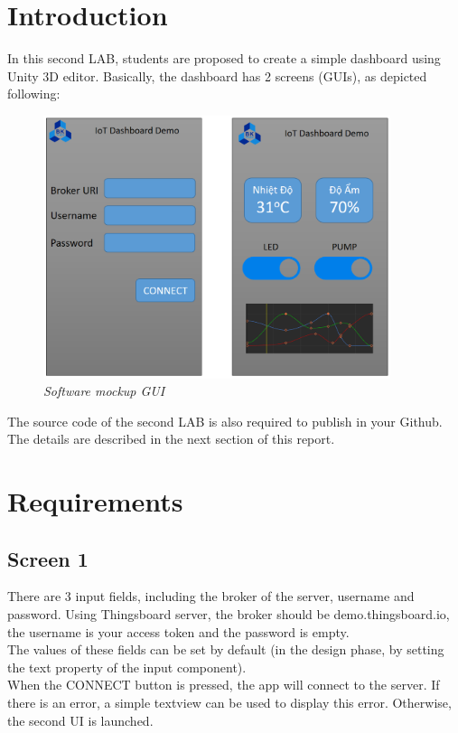 \documentclass[a4paper,11pt]{article}
\theoremstyle{mytheor}
\begin{document}
\renewcommand{\contentsname}{Content}
\newpage
\vspace{1cm}
\tableofcontents
\newpage

\section{Introduction}
In this second LAB, students are proposed to create a simple dashboard using Unity 3D editor. Basically, the dashboard has 2 screens (GUIs), as depicted following:
\begin{figure}[!htp]
    \centering
    \includegraphics[width=4in]{Lab2_Demo.png}
    \caption{\textit{Software mockup GUI}}
    \label{}
\end{figure}

The source code of the second LAB is also required to publish in your Github. The details are described in the next section of this report.

\section{Requirements}
\subsection{Screen 1}
There are 3 input fields, including the broker of the server, username and password. Using Thingsboard server, the broker should be demo.thingsboard.io, the username is your access token and the password is empty.\\

The values of these fields can be set by default (in the design phase, by setting the text property of the input component).\\

When the CONNECT button is pressed, the app will connect to the server. If there is an error, a simple textview can be used to display this error. Otherwise, the second UI is launched.\\
\end{document}
